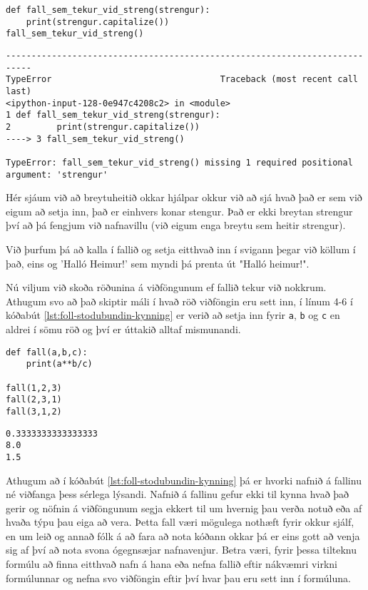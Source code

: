 \begin{lstlisting}[caption=Villumelding fyrir ranga notkun á viðföngum, label=lst:foll-villa-vidfang]
def fall_sem_tekur_vid_streng(strengur):
	print(strengur.capitalize())
fall_sem_tekur_vid_streng()
\end{lstlisting}
\lstset{style=uttak}
\begin{lstlisting}
---------------------------------------------------------------------------
TypeError                                 Traceback (most recent call last)
<ipython-input-128-0e947c4208c2> in <module>
1 def fall_sem_tekur_vid_streng(strengur):
2         print(strengur.capitalize())
----> 3 fall_sem_tekur_vid_streng()

TypeError: fall_sem_tekur_vid_streng() missing 1 required positional argument: 'strengur'
\end{lstlisting}
\lstset{style=venjulegt}

Hér sjáum við að breytuheitið okkar hjálpar okkur við að sjá hvað það er sem við eigum að setja inn, það er einhvers konar stengur.
Það er ekki breytan strengur því að þá fengjum við nafnavillu (við eigum enga breytu sem heitir strengur).

Við þurfum þá að kalla í fallið og setja eitthvað inn í svigann þegar við köllum í það, eins og 'Halló Heimur!' sem myndi þá prenta út "Halló heimur!".

Nú viljum við skoða röðunina á viðföngunum ef fallið tekur við nokkrum.
Athugum svo að það skiptir máli í hvað röð viðföngin eru sett inn, í línum 4-6 í kóðabút \ref{lst:foll-stodubundin-kynning} er verið að setja inn fyrir \texttt{a}, \texttt{b} og \texttt{c} en aldrei í sömu röð og því er úttakið alltaf mismunandi.

\begin{lstlisting}[caption=Stöðubundin viðföng kynnt, label=lst:foll-stodubundin-kynning]
def fall(a,b,c):
	print(a**b/c)

fall(1,2,3)
fall(2,3,1)
fall(3,1,2)
\end{lstlisting}
\lstset{style=uttak}
\begin{lstlisting}
0.3333333333333333
8.0
1.5
\end{lstlisting}
\lstset{style=venjulegt}

Athugum að í kóðabút \ref{lst:foll-stodubundin-kynning} þá er hvorki nafnið á fallinu né viðfanga þess sérlega lýsandi.
Nafnið á fallinu gefur ekki til kynna hvað það gerir og nöfnin á viðföngunum segja ekkert til um hvernig þau verða notuð eða af hvaða týpu þau eiga að vera.
Þetta fall væri mögulega nothæft fyrir okkur sjálf, en um leið og annað fólk á að fara að nota kóðann okkar þá er eins gott að venja sig af því að nota svona ógegnsæjar nafnavenjur.
Betra væri, fyrir þessa tilteknu formúlu að finna eitthvað nafn á hana eða nefna fallið eftir nákvæmri virkni formúlunnar og nefna svo viðföngin eftir því hvar þau eru sett inn í formúluna.

